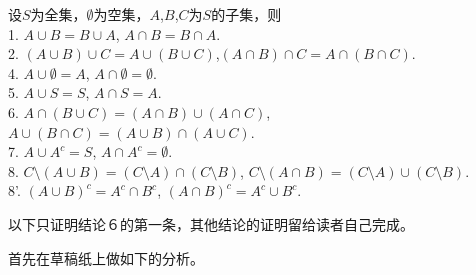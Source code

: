 \begin{Thm}
设$S$为全集，$\emptyset$为空集，$A$,$B$,$C$为$S$的子集，则\\
1. $A \cup B = B \cup A$, $A \cap B = B \cap A$.\\
2. $(A \cup B) \cup C = A \cup (B \cup C)$,$(A \cap B) \cap C = A \cap (B \cap C)$.\\
4. $A \cup \emptyset = A$, $A \cap \emptyset = \emptyset$.\\
5. $A \cup S = S$, $A \cap S = A$.\\
6. $A \cap (B \cup C) = (A \cap B) \cup (A \cap C)$, $A \cup (B \cap C) = (A \cup B) \cap (A \cup C)$.\\
7. $A \cup A^c = S$, $A \cap A^c = \emptyset$.\\
8. $C\setminus (A \cup B) = (C \setminus A) \cap (C \setminus B)$, $C \setminus (A \cap B) = (C \setminus A) \cup (C \setminus B)$.\\ 
8'. $(A \cup B)^c = A^c \cap B^c$, $(A \cap B)^c = A^c \cup B^c$.\\
\end{Thm}
  以下只证明结论６的第一条，其他结论的证明留给读者自己完成。

  首先在草稿纸上做如下的分析。

